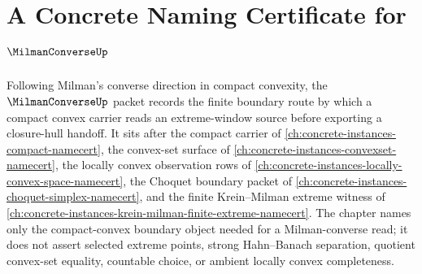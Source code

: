 \chapter{A Concrete Naming Certificate for $\MilmanConverseUp$}
\label{ch:concrete-instances-milman-converse-namecert}

Following Milman's converse direction in compact convexity, the $\MilmanConverseUp$ packet records the finite boundary route by which a compact convex carrier reads an extreme-window source before exporting a closure-hull handoff. It sits after the compact carrier of \autoref{ch:concrete-instances-compact-namecert}, the convex-set surface of \autoref{ch:concrete-instances-convexset-namecert}, the locally convex observation rows of \autoref{ch:concrete-instances-locally-convex-space-namecert}, the Choquet boundary packet of \autoref{ch:concrete-instances-choquet-simplex-namecert}, and the finite Krein--Milman extreme witness of \autoref{ch:concrete-instances-krein-milman-finite-extreme-namecert}. The chapter names only the compact-convex boundary object needed for a Milman-converse read; it does not assert selected extreme points, strong Hahn--Banach separation, quotient convex-set equality, countable choice, or ambient locally convex completeness.

